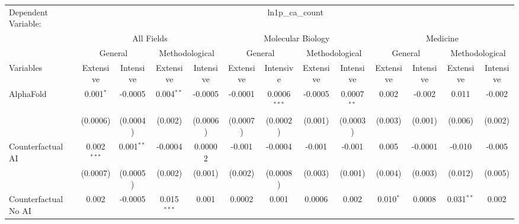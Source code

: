 \begingroup
\centering
\begin{tabular}{lcccccccccccc}
   \tabularnewline \midrule \midrule
   Dependent Variable: & \multicolumn{12}{c}{ln1p\_ca\_count}\\
 & \multicolumn{4}{c}{All Fields} & \multicolumn{4}{c}{Molecular Biology} & \multicolumn{4}{c}{Medicine} \\
\cmidrule(lr){2-5} \cmidrule(lr){6-9} \cmidrule(lr){10-13}
 & \multicolumn{2}{c}{General} & \multicolumn{2}{c}{Methodological} & \multicolumn{2}{c}{General} & \multicolumn{2}{c}{Methodological} & \multicolumn{2}{c}{General} & \multicolumn{2}{c}{Methodological} \\
\cmidrule(lr){2-3} \cmidrule(lr){4-5} \cmidrule(lr){6-7} \cmidrule(lr){8-9} \cmidrule(lr){10-11} \cmidrule(lr){12-13}
Variables & \multicolumn{1}{c}{Extensive} & \multicolumn{1}{c}{Intensive} & \multicolumn{1}{c}{Extensive} & \multicolumn{1}{c}{Intensive} & \multicolumn{1}{c}{Extensive} & \multicolumn{1}{c}{Intensive} & \multicolumn{1}{c}{Extensive} & \multicolumn{1}{c}{Intensive} & \multicolumn{1}{c}{Extensive} & \multicolumn{1}{c}{Intensive} & \multicolumn{1}{c}{Extensive} & \multicolumn{1}{c}{Intensive} \\
\cmidrule(lr){1-1}\cmidrule(lr){2-2} \cmidrule(lr){3-3} \cmidrule(lr){4-4} \cmidrule(lr){5-5} \cmidrule(lr){6-6} \cmidrule(lr){7-7} \cmidrule(lr){8-8} \cmidrule(lr){9-9} \cmidrule(lr){10-10} \cmidrule(lr){11-11} \cmidrule(lr){12-12} \cmidrule(lr){13-13}
   AlphaFold                                & 0.001$^{*}$   & -0.0005      & 0.004$^{**}$   & -0.0005        & -0.0001     & 0.0006$^{***}$ & -0.0005 & 0.0007$^{**}$ & 0.002        & -0.002   & 0.011         & -0.002\\   
                                            & (0.0006)      & (0.0004)     & (0.002)        & (0.0006)       & (0.0007)    & (0.0002)       & (0.001) & (0.0003)      & (0.003)      & (0.001)  & (0.006)       & (0.002)\\   
   Counterfactual AI                        & 0.002$^{***}$ & 0.001$^{**}$ & -0.0004        & 0.00002        & -0.001      & -0.0004        & -0.001  & -0.001        & 0.005        & -0.0001  & -0.010        & -0.005\\   
                                            & (0.0007)      & (0.0005)     & (0.002)        & (0.001)        & (0.002)     & (0.0008)       & (0.003) & (0.001)       & (0.004)      & (0.003)  & (0.012)       & (0.005)\\   
   Counterfactual No AI                     & 0.002         & -0.0005      & 0.015$^{***}$  & 0.001          & 0.0002      & 0.001          & 0.0006  & 0.002         & 0.010$^{*}$  & 0.0008   & 0.031$^{**}$  & 0.002\\   

\end{tabular}
